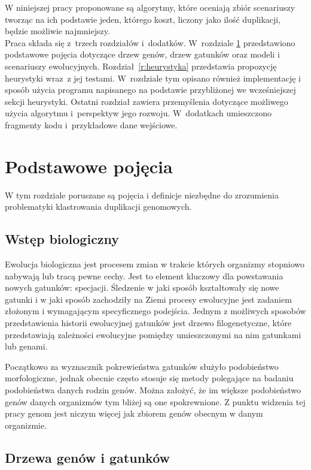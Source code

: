 \documentclass[licencjacka]{pracamgr}
\begin{document}
W niniejszej pracy proponowane są algorytmy, które oceniają zbiór scenariuszy tworząc na ich podstawie jeden, którego koszt, liczony jako ilość duplikacji, będzie możliwie najmniejszy.
\\
Praca składa się z~trzech rozdziałów i~dodatków.
W~rozdziale \ref{r:pojecia} przedstawiono podstawowe pojęcia dotyczące drzew genów, drzew gatunków oraz modeli i scenariuszy ewolucyjnych.  
Rozdział~\ref{r:heurystyka} przedstawia propozycję heurystyki wraz~z jej testami.  W~rozdziale tym opisano również implementację i sposób użycia programu napisanego na podstawie przybliżonej we wcześniejszej sekcji heurystyki.
Ostatni rozdział zawiera przemyślenia dotyczące możliwego użycia algorytmu i~perspektyw jego rozwoju. W~dodatkach umieszczono fragmenty kodu i~przykładowe dane wejściowe.

\chapter{Podstawowe pojęcia}\label{r:pojecia}

W tym rozdziale poruszane są pojęcia i definicje niezbędne do zrozumienia problematyki klastrowania duplikacji genomowych. 
\section{Wstęp biologiczny}

Ewolucja biologiczna jest procesem zmian w trakcie których organizmy stopniowo nabywają lub tracą pewne cechy. Jest to element kluczowy dla powstawania nowych gatunków: specjacji. Śledzenie w jaki sposób kształtowały się nowe gatunki i w jaki sposób zachodziły na Ziemi procesy ewolucyjne jest zadaniem złożonym i wymagającym specyficznego podejścia. Jednym z możliwych sposobów przedstawienia historii ewolucyjnej gatunków jest drzewo filogenetyczne, które przedstawiają zależności ewolucyjne pomiędzy umieszczonymi na nim gatunkami lub genami. 

Początkowo za wyznacznik pokrewieństwa gatunków służyło podobieństwo morfologiczne, jednak obecnie często stosuje się metody polegające na badaniu podobieństwa danych rodzin genów. Można założyć, że im większe podobieństwo genów danych organizmów tym bliżej są one spokrewnione. Z punktu widzenia tej pracy genom jest niczym więcej jak zbiorem genów obecnym w danym organizmie. 


\section{Drzewa genów i gatunków}
\end{document}
